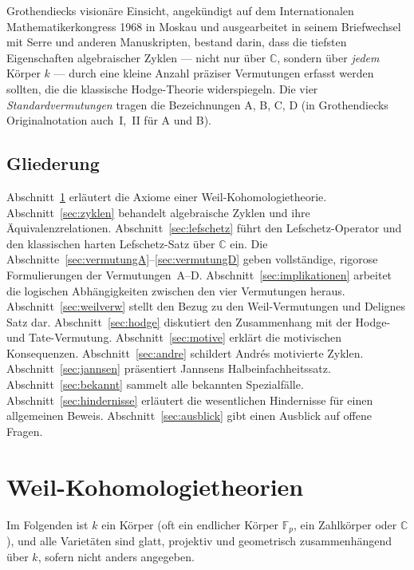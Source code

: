 \documentclass[12pt,a4paper]{amsart}
\theoremstyle{definition}
\newcommand{\C}{\mathbb{C}}
\newcommand{\Fp}{\mathbb{F}_p}
\begin{document}
Grothendiecks visionäre Einsicht, angekündigt auf dem Internationalen
Mathematikerkongress 1968 in Moskau und ausgearbeitet in seinem Briefwechsel
mit Serre und anderen Manuskripten, bestand darin, dass die tiefsten
Eigenschaften algebraischer Zyklen --- nicht nur über $\C$, sondern über
\emph{jedem} Körper $k$ --- durch eine kleine Anzahl präziser Vermutungen
erfasst werden sollten, die die klassische Hodge-Theorie widerspiegeln.
Die vier \emph{Standardvermutungen} tragen die Bezeichnungen A, B, C, D
(in Grothendiecks Originalnotation auch~I,~II für A und B).

\subsection*{Gliederung}

Abschnitt~\ref{sec:weil} erläutert die Axiome einer Weil-Kohomologietheorie.
Abschnitt~\ref{sec:zyklen} behandelt algebraische Zyklen und ihre Äquivalenzrelationen.
Abschnitt~\ref{sec:lefschetz} führt den Lefschetz-Operator und den klassischen
harten Lefschetz-Satz über $\C$ ein.
Die Abschnitte~\ref{sec:vermutungA}--\ref{sec:vermutungD} geben vollständige,
rigorose Formulierungen der Vermutungen~A--D.
Abschnitt~\ref{sec:implikationen} arbeitet die logischen Abhängigkeiten
zwischen den vier Vermutungen heraus.
Abschnitt~\ref{sec:weilverw} stellt den Bezug zu den Weil-Vermutungen und
Delignes Satz dar.
Abschnitt~\ref{sec:hodge} diskutiert den Zusammenhang mit der Hodge- und
Tate-Vermutung.
Abschnitt~\ref{sec:motive} erklärt die motivischen Konsequenzen.
Abschnitt~\ref{sec:andre} schildert Andrés motivierte Zyklen.
Abschnitt~\ref{sec:jannsen} präsentiert Jannsens Halbeinfachheitssatz.
Abschnitt~\ref{sec:bekannt} sammelt alle bekannten Spezialfälle.
Abschnitt~\ref{sec:hindernisse} erläutert die wesentlichen Hindernisse
für einen allgemeinen Beweis.
Abschnitt~\ref{sec:ausblick} gibt einen Ausblick auf offene Fragen.

\section{Weil-Kohomologietheorien}\label{sec:weil}

Im Folgenden ist $k$ ein Körper (oft ein endlicher Körper $\Fp$, ein
Zahlkörper oder $\C$), und alle Varietäten sind glatt, projektiv und
geometrisch zusammenhängend über $k$, sofern nicht anders angegeben.
\end{document}
